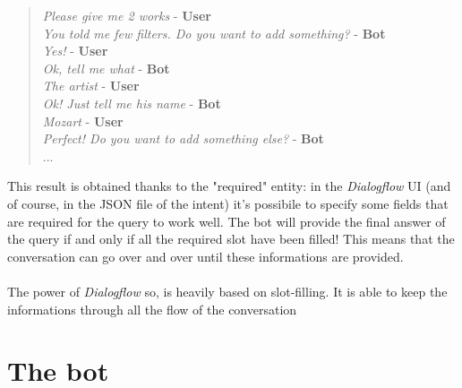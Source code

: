 \documentclass[a4paper,12pt]{report}
\begin{document}
	\begin{verse}
		\textit{Please give me 2 works} - \textbf{User}\\
		\textit{You told me few filters. Do you want to add something?} - \textbf{Bot}\\
		\textit{Yes!} - \textbf{User}\\
		\textit{Ok, tell me what} - \textbf{Bot}\\
		\textit{The artist} - \textbf{User}\\
		\textit{Ok! Just tell me his name} - \textbf{Bot}\\
		\textit{Mozart} - \textbf{User}\\
		\textit{Perfect! Do you want to add something else?} - \textbf{Bot}\\
		...\\
	\end{verse}
	This result is obtained thanks to the "required" entity: in the \textit{Dialogflow} UI (and of course, in the JSON file of the intent) it's possibile to specify some fields that are required for the query to work well. The bot will provide the final answer of the query if and only if all the required slot have been filled! This means that the conversation can go over and over until these informations are provided.\\\\
	The power of \textit{Dialogflow} so, is heavily based on slot-filling. It is able to keep the informations through all the flow of the conversation 

\chapter{The bot}
\end{document}
